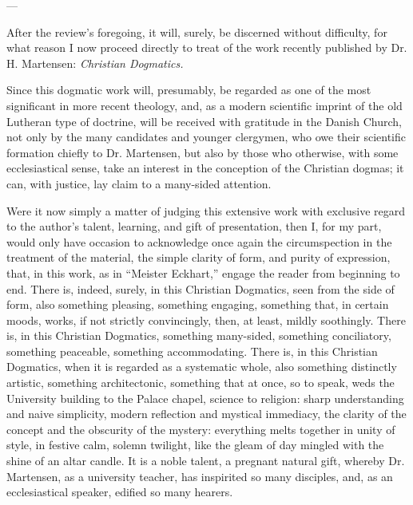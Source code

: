 \documentclass[12pt]{book}
\begin{document}
\begin{center}---\end{center}

After the review's foregoing, it will, surely, be discerned without difficulty, for what reason I now proceed directly to treat of the work recently published by Dr. H. Martensen: \emph{Christian Dogmatics.}

Since this dogmatic work will, presumably, be regarded as one of the most significant in more recent theology, and, as a modern scientific imprint of the old Lutheran type of doctrine, will be received with gratitude in the Danish Church, not only by the many candidates and younger clergymen, who owe their scientific formation chiefly to Dr. Martensen, but also by those who otherwise, with some ecclesiastical sense, take an interest in the conception of the Christian dogmas; it can, with justice, lay claim to a many-sided attention.

Were it now simply a matter of judging this extensive work with exclusive regard to the
author's talent, learning, and gift of presentation, then I, for my part, would only have occasion to acknowledge once again the circumspection in the treatment of the material, the simple clarity of form, and purity of expression, that, in this work, as in ``Meister Eckhart,'' engage the reader from beginning to end. There is, indeed, surely, in this Christian Dogmatics, seen from the side of form, also something pleasing, something engaging, something that, in certain moods, works, if not strictly convincingly, then, at least, mildly soothingly. There is, in this Christian Dogmatics, something many-sided, something conciliatory, something peaceable, something accommodating. There is, in this Christian Dogmatics, when it is regarded as a systematic whole, also something distinctly artistic, something architectonic, something that at once, so to speak, weds the University building to the Palace chapel, science to religion: sharp understanding and naive simplicity, modern reflection and mystical immediacy, the clarity of the concept and the obscurity of the mystery: everything melts together in unity of style, in festive calm, solemn twilight, like the gleam of day mingled with the shine of an altar candle. It is a noble talent, a pregnant natural gift, whereby Dr. Martensen, as a university teacher, has inspirited so many disciples, and, as an ecclesiastical speaker, edified so many hearers.
\end{document}
